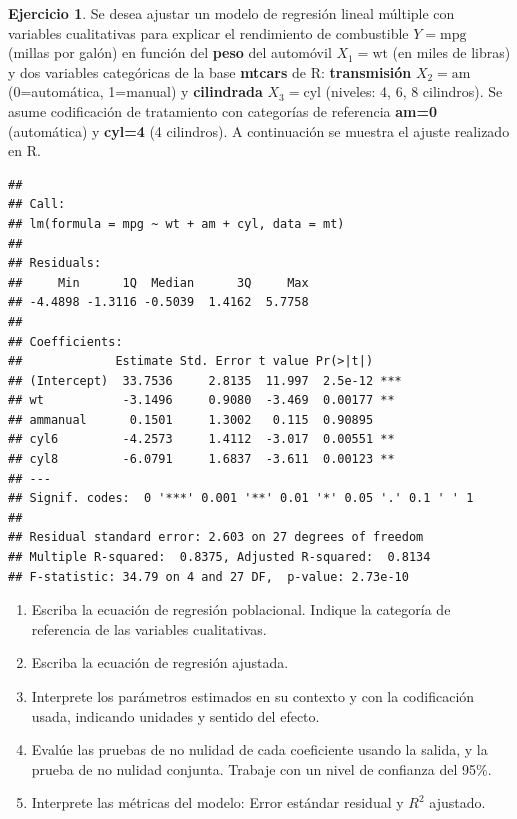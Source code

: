\documentclass[
  11pt,
]{book}
\theoremstyle{definition}
\theoremstyle{definition}
\theoremstyle{definition}
\newtheorem{exercise}{Ejercicio}[chapter]
\theoremstyle{definition}
\theoremstyle{remark}
\begin{document}
\begin{exercise}

Se desea ajustar un modelo de regresión lineal múltiple con variables cualitativas para explicar el rendimiento de combustible \(Y=\text{mpg}\) (millas por galón) en función del \textbf{peso} del automóvil \(X_1=\text{wt}\) (en miles de libras) y dos variables categóricas de la base \textbf{mtcars} de R: \textbf{transmisión} \(X_2=\text{am}\) (0=automática, 1=manual) y \textbf{cilindrada} \(X_3=\text{cyl}\) (niveles: 4, 6, 8 cilindros). Se asume codificación de tratamiento con categorías de referencia \textbf{am=0} (automática) y \textbf{cyl=4} (4 cilindros). A continuación se muestra el ajuste realizado en R.

\begin{verbatim}
## 
## Call:
## lm(formula = mpg ~ wt + am + cyl, data = mt)
## 
## Residuals:
##     Min      1Q  Median      3Q     Max 
## -4.4898 -1.3116 -0.5039  1.4162  5.7758 
## 
## Coefficients:
##             Estimate Std. Error t value Pr(>|t|)    
## (Intercept)  33.7536     2.8135  11.997  2.5e-12 ***
## wt           -3.1496     0.9080  -3.469  0.00177 ** 
## ammanual      0.1501     1.3002   0.115  0.90895    
## cyl6         -4.2573     1.4112  -3.017  0.00551 ** 
## cyl8         -6.0791     1.6837  -3.611  0.00123 ** 
## ---
## Signif. codes:  0 '***' 0.001 '**' 0.01 '*' 0.05 '.' 0.1 ' ' 1
## 
## Residual standard error: 2.603 on 27 degrees of freedom
## Multiple R-squared:  0.8375, Adjusted R-squared:  0.8134 
## F-statistic: 34.79 on 4 and 27 DF,  p-value: 2.73e-10
\end{verbatim}

\begin{enumerate}
\def\labelenumi{\arabic{enumi}.}
\item
  Escriba la ecuación de regresión poblacional. Indique la categoría de referencia de las variables cualitativas.
\item
  Escriba la ecuación de regresión ajustada.
\item
  Interprete los parámetros estimados en su contexto y con la codificación usada, indicando unidades y sentido del efecto.
\item
  Evalúe las pruebas de no nulidad de cada coeficiente usando la salida, y la prueba de no nulidad conjunta. Trabaje con un nivel de confianza del 95\%.
\item
  Interprete las métricas del modelo: Error estándar residual y \(R^2\) ajustado.
\end{enumerate}

\end{exercise}
\end{document}
